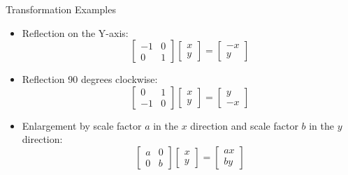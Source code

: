 \documentclass[aspectratio=43]{beamer}
\begin{document}
\begin{frame}{Transformation Examples}
  \begin{itemize}
    \item Reflection on the Y-axis: $$
            \begin{bmatrix} -1 & 0 \\ 0 & 1\end{bmatrix} \begin{bmatrix} x \\ y \end{bmatrix} = \begin{bmatrix} -x \\ y \end{bmatrix}
          $$

    \item Reflection  90 degrees clockwise: $$
            \begin{bmatrix} 0 & 1 \\ -1 & 0\end{bmatrix} \begin{bmatrix} x \\ y \end{bmatrix} = \begin{bmatrix} y \\ -x \end{bmatrix}
          $$

    \item Enlargement by scale factor $a$ in the $x$ direction and scale factor $b$ in the $y$ direction: $$
            \begin{bmatrix} a & 0 \\ 0 & b \end{bmatrix} \begin{bmatrix} x \\ y \end{bmatrix} = \begin{bmatrix} ax \\ by \end{bmatrix}
          $$
  \end{itemize}
\end{frame}
\end{document}
